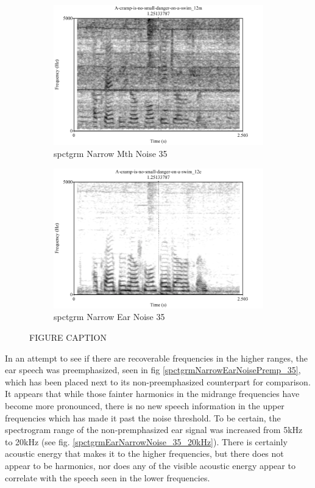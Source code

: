 \documentclass[dissertation,copyright]{uathesis}
\begin{document}
\begin{figure}
\centering
\begin{subfigure}{0.5\textwidth}
  \centering
  \includegraphics[width=1\linewidth]{figure/spctgrmNarrowMthNoise_35.pdf}
  \caption{spctgrm Narrow Mth Noise 35}
  \label{spctgrmNarrowMouthNoise_35}
\end{subfigure}%
\hfill
\begin{subfigure}{0.5\textwidth}
  \centering
  \includegraphics[width=1\linewidth]{figure/spctgrmNarrowEarNoise_35.pdf}
  \caption{spctgrm Narrow Ear Noise 35}
  \label{spctgrmNarrowEarNoise_35}
\end{subfigure}
\caption{FIGURE CAPTION}
\label{fig:noise_mth_ear}
\end{figure}

In an attempt to see if there are recoverable frequencies in the higher ranges, the ear speech was preemphasized, seen in fig \ref{spctgrmNarrowEarNoisePremp_35}, which has been placed next to its non-preemphasized counterpart for comparison.  It appears that while those fainter harmonics in the midrange frequencies have become more pronounced, there is no new speech information in the upper frequencies which has made it past the noise threshold.  To be certain, the spectrogram range of the non-premphasized ear signal was increased from 5kHz to 20kHz (see fig. \ref{spctgrmEarNarrowNoise_35_20kHz}). There is certainly acoustic energy that makes it to the higher frequencies, but there does not appear to be harmonics, nor does any of the visible acoustic energy appear to correlate with the speech seen in the lower frequencies.
\end{document}
